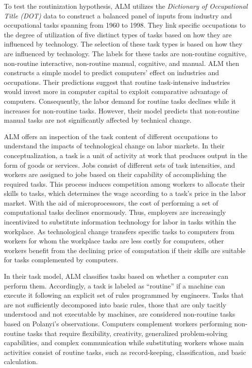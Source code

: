\begin{onehalfspace}

To test the routinization hypothesis, ALM utilizes the \emph{Dictionary
of Occupational Title (DOT)} data to construct a balanced panel of
inputs from industry and occupational tasks spanning from 1960 to
1998. They link specific occupations to the degree of utilization
of five distinct types of tasks based on how they are influenced by
technology. The selection of these task types is based on how they
are influenced by technology. The labels for these tasks are non-routine
cognitive, non-routine interactive, non-routine manual, cognitive,
and manual. ALM then constructs a simple model to predict computers'
effect on industries and occupations. Their predictions suggest that
routine task-intensive industries would invest more in computer capital
to exploit comparative advantage of computers. Consequently, the labor
demand for routine tasks declines while it increases for non-routine
tasks. However, their model predicts that non-routine manual tasks
are not significantly affected by technical change.

ALM offers an inspection of the task content of different occupations
to understand the impacts of technological change on labor markets.
In their conceptualization, a task is a unit of activity at work that
produces output in the form of goods or services. Jobs consist of
different sets of task intensities, and workers are assigned to jobs
based on their capability of accomplishing the required tasks. This
process induces competition among workers to allocate their skills
to tasks, which determines the wage according to a task's price in
the labor market. With the aid of microprocessors, the cost of performing
a set of computational tasks declines enormously. Thus, employers
are increasingly incentivized to substitute information technology
for labor in tasks within the workplace. As technological change transfers
specific tasks to computers from workers for whom the workplace tasks
are less costly for computers, other workers benefit from the declining
price of computation if their skills are suitable for tasks complemented
by computers.

In their task model, ALM classifies tasks based on whether a computer
can perform them. Accordingly, a task is labeled as ``routine''
if a machine can execute it following an explicit set of rules programmed
by engineers. Tasks that are not sufficiently decomposed into basic
rules, those that are only tacitly understood and not executable by
machines, are considered non-routine tasks based on Polanyi's observations.
Computers complement workers performing non-routine tasks that require
flexibility, creativity, generalized problem-solving capabilities,
and complex communication while substituting workers whose main activities
consist of routine tasks, such as record-keeping, classification,
and basic calculation.


\end{onehalfspace}

